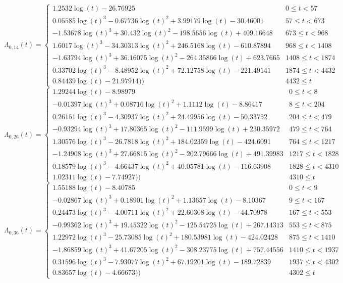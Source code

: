 \documentclass[
]{article}
\begin{document}
\begin{equation}
\Lambda_{0,14}(t)=\begin{cases} 1.2532\log(t)-26.76925 & 0 \le t < 57 \\ 0.05585\log(t)^3-0.67736\log(t)^2+3.99179\log(t)-30.46001 & 57 \le t < 673 \\ -1.53678\log(t)^3+30.432\log(t)^2-198.5656\log(t)+409.16648 & 673 \le t < 968 \\ 1.6017\log(t)^3-34.30313\log(t)^2+246.5168\log(t)-610.87894 & 968 \le t < 1408 \\ -1.63794\log(t)^3+36.16075\log(t)^2-264.35866\log(t)+623.7665 & 1408 \le t < 1874 \\ 0.33702\log(t)^3-8.48952\log(t)^2+72.12758\log(t)-221.49141 & 1874 \le t < 4432 \\ 0.84439\log(t)-21.97914)) & 4432 \le t \label{eq:CH-Five-14}\end{cases}
\end{equation}
\begin{equation}
\Lambda_{0,26}(t)=\begin{cases} 1.29244\log(t)-8.98979 & 0 \le t < 8 \\ -0.01397\log(t)^3+0.08716\log(t)^2+1.1112\log(t)-8.86417 & 8 \le t < 204 \\ 0.26151\log(t)^3-4.30937\log(t)^2+24.49956\log(t)-50.33752 & 204 \le t < 479 \\ -0.93294\log(t)^3+17.80365\log(t)^2-111.9599\log(t)+230.35972 & 479 \le t < 764 \\ 1.30576\log(t)^3-26.7818\log(t)^2+184.02359\log(t)-424.6091 & 764 \le t < 1217 \\ -1.24908\log(t)^3+27.66815\log(t)^2-202.79666\log(t)+491.39983 & 1217 \le t < 1828 \\ 0.18579\log(t)^3-4.66437\log(t)^2+40.05781\log(t)-116.63908 & 1828 \le t < 4310 \\ 1.02311\log(t)-7.74927)) & 4310 \le t \label{eq:CH-Five-26}\end{cases}
\end{equation}
\begin{equation}
\Lambda_{0,36}(t)=\begin{cases} 1.55188\log(t)-8.40785 & 0 \le t < 9 \\ -0.02867\log(t)^3+0.18901\log(t)^2+1.13657\log(t)-8.10367 & 9 \le t < 167 \\ 0.24473\log(t)^3-4.00711\log(t)^2+22.60308\log(t)-44.70978 & 167 \le t < 553 \\ -0.99362\log(t)^3+19.45322\log(t)^2-125.54725\log(t)+267.14313 & 553 \le t < 875 \\ 1.22972\log(t)^3-25.73085\log(t)^2+180.53981\log(t)-424.02428 & 875 \le t < 1410 \\ -1.86859\log(t)^3+41.67205\log(t)^2-308.23775\log(t)+757.44556 & 1410 \le t < 1937 \\ 0.31596\log(t)^3-7.93077\log(t)^2+67.19201\log(t)-189.72839 & 1937 \le t < 4302 \\ 0.83657\log(t)-4.66673)) & 4302 \le t \label{eq:CH-Five-36}\end{cases}
\end{equation}
\end{document}
